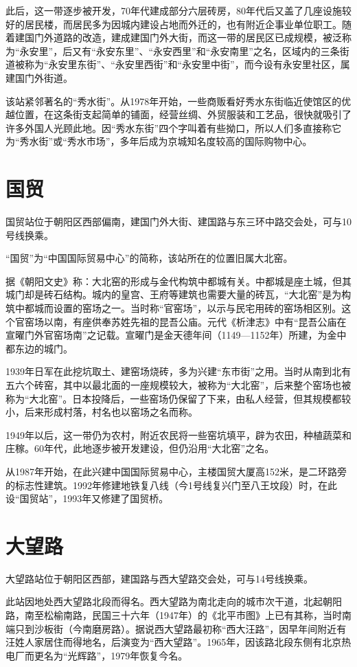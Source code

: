 此后，这一带逐步被开发，70年代建成部分六层砖房，80年代后又盖了几座设施较好的居民楼，而居民多为因城内建设占地而外迁的，也有附近企事业单位职工。随着建国门外道路的改造，建成建国门外大街，而这一带的居民区已成规模，被泛称为“永安里”，后又有“永安东里”、“永安西里”和“永安南里”之名，区域内的三条街道被称为“永安里东街”、“永安里西街”和“永安里中街”，而今设有永安里社区，属建国门外街道。

该站紧邻著名的“秀水街”。从1978年开始，一些商贩看好秀水东街临近使馆区的优越位置，在这条街支起简单的铺面，经营丝绸、外贸服装和工艺品，很快就吸引了许多外国人光顾此地。因“秀水东街”四个字叫着有些拗口，所以人们多直接称它为“秀水街”或“秀水市场”，多年后成为京城知名度较高的国际购物中心。

\section{国贸}
国贸站位于朝阳区西部偏南，建国门外大街、建国路与东三环中路交会处，可与10号线换乘。

“国贸”为“中国国际贸易中心”的简称，该站所在的位置旧属大北窑。

据《朝阳文史》称：大北窑的形成与金代构筑中都城有关。中都城是座土城，但其城门却是砖石结构。城内的皇宫、王府等建筑也需要大量的砖瓦，“大北窑”是为构筑中都城而设置的窑场之一。当时称“官窑场”，以示与民宅用砖的窑场相区别。这个官窑场以南，有座供奉苏姓先祖的昆吾公庙。元代《析津志》中有“昆吾公庙在宣曜门外官窑场南”之记载。宣曜门是金天德年间（1149—1152年）所建，为金中都东边的城门。

1939年日军在此挖坑取土、建窑场烧砖，多为兴建“东市街”之用。当时从南到北有五六个砖窑，其中以最北面的一座规模较大，被称为“大北窑”，后来整个窑场也被称为“大北窑”。日本投降后，一些窑场仍保留了下来，由私人经营，但其规模都较小，后来形成村落，村名也以窑场之名而称。

1949年以后，这一带仍为农村，附近农民将一些窑坑填平，辟为农田，种植蔬菜和庄稼。60年代，此地逐步被开发建设，但仍沿用“大北窑”之名。

从1987年开始，在此兴建中国国际贸易中心，主楼国贸大厦高152米，是二环路旁的标志性建筑。1992年修建地铁复八线（今1号线复兴门至八王坟段）时，在此设“国贸站”，1993年又修建了国贸桥。

\section{大望路}
大望路站位于朝阳区西部，建国路与西大望路交会处，可与14号线换乘。

此站因地处西大望路北段而得名。西大望路为南北走向的城市次干道，北起朝阳路，南至松榆南路，民国三十六年（1947年）的《北平市图》上已有其称，当时南端只到沙板街（今南磨房路）。据说西大望路最初称“西大汪路”，因早年间附近有汪姓人家居住而得地名，后演变为“西大望路”。1965年，因该路北段东侧有北京热电厂而更名为“光辉路”，1979年恢复今名。

